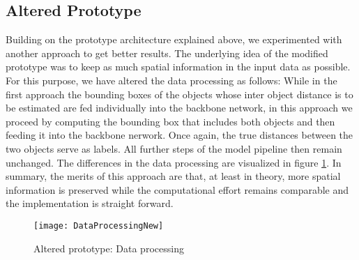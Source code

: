 \documentclass[a4paper, 11pt]{article}
\begin{document}
\begin{multicols}{2}
\subsection{Altered Prototype}\label{sec:altered_prototype}
\begin{flushleft}
Building on the prototype architecture explained above, we experimented with another approach to get better results. The underlying idea of the modified prototype was to keep as much spatial information in the input data as possible. For this purpose, we have altered the data processing as follows: While in the first approach the bounding boxes of the objects whose inter object distance is to be estimated are fed individually into the backbone network, in this approach we proceed by computing the bounding box that includes both objects and then feeding it into the backbone nerwork. Once again, the true distances between the two objects serve as labels. All further steps of the model pipeline then remain unchanged. The differences in the data processing are visualized in figure \ref{fig:data_proc_new}. In summary, the merits of this approach are that, at least in theory, more spatial information is preserved while the computational effort remains comparable and the implementation is straight forward.
\begin{figure}[H]
\centering
\texttt{[image: DataProcessingNew]}
\caption{Altered prototype: Data processing}
\label{fig:data_proc_new}
\end{figure}
\end{flushleft}


\end{multicols}
\end{document}
